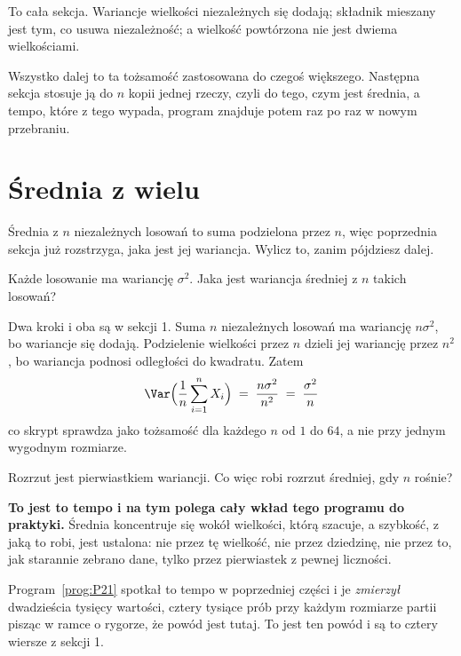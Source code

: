 \begin{fr}
To cała sekcja. Wariancje wielkości niezależnych się dodają; składnik mieszany
jest tym, co usuwa niezależność; a wielkość powtórzona nie jest dwiema
wielkościami.

Wszystko dalej to ta tożsamość zastosowana do czegoś większego. Następna
sekcja stosuje ją do $n$ kopii jednej rzeczy, czyli do tego, czym jest
średnia, a tempo, które z tego wypada, program znajduje potem raz po raz w
nowym przebraniu.
\end{fr}

\section{Średnia z wielu}
\label{sec:P25-average}

\begin{fr}
Średnia z $n$ niezależnych losowań to suma podzielona przez $n$, więc
poprzednia sekcja już rozstrzyga, jaka jest jej wariancja. Wylicz to, zanim
pójdziesz dalej.

Każde losowanie ma wariancję $\sigma^{2}$. Jaka jest wariancja średniej z $n$
takich losowań?
\dotline
\nextframe
\end{fr}

\begin{fr}

Dwa kroki i oba są w sekcji 1. Suma $n$ niezależnych losowań ma wariancję
$n\sigma^{2}$, bo wariancje się dodają. Podzielenie wielkości przez $n$ dzieli
jej wariancję przez $n^{2}$, bo wariancja podnosi odległości do kwadratu.
Zatem
\[ \Var\Bigl(\frac{1}{n}\sum_{i=1}^{n} X_i\Bigr)
   \;=\; \frac{n\sigma^{2}}{n^{2}} \;=\; \frac{\sigma^{2}}{n} \]
co skrypt sprawdza jako tożsamość dla każdego $n$ od $1$ do $64$, a nie przy
jednym wygodnym rozmiarze.

Rozrzut jest pierwiastkiem wariancji. Co więc robi rozrzut średniej, gdy $n$
rośnie?
\dotline
\nextframe
\end{fr}

\begin{fr}

\textbf{To jest to tempo i na tym polega cały wkład tego programu do
praktyki.} Średnia koncentruje się wokół wielkości, którą szacuje, a szybkość,
z jaką to robi, jest ustalona: nie przez tę wielkość, nie przez dziedzinę, nie
przez to, jak starannie zebrano dane, tylko przez pierwiastek z pewnej
liczności.

Program~\ref{prog:P21} spotkał to tempo w poprzedniej części i je
\emph{zmierzył}
\dash{} dwadzieścia tysięcy wartości, cztery tysiące prób przy każdym
rozmiarze partii \dash{} pisząc w ramce o rygorze, że powód jest tutaj. To
jest ten powód i są to cztery wiersze z sekcji 1.
\end{fr}

